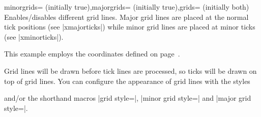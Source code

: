 \begin{pgfplotsxykeylist}{\x minorgrids= (initially true),\x majorgrids= (initially true),grids= (initially both)}
Enables/disables different grid lines. Major grid lines are placed at the normal tick positions (see |xmajorticks|) while minor grid lines are placed at minor ticks (see |xminorticks|). 

This example employs the coordinates defined on page~\pageref{page:plotcoords:src}.
\begin{codeexample}[]
\begin{tikzpicture}
\begin{loglogaxis}[
	xlabel={\textsc{Dof}},
	ylabel={$L_2$ Error},
	grid=major
]
\plotcoords
\end{loglogaxis}
\end{tikzpicture}
\end{codeexample}

\begin{codeexample}[]
\end{codeexample}

Grid lines will be drawn before tick lines are processed, so ticks will be drawn on top of grid lines. You can configure the appearance of grid lines with the styles
\begin{codeexample}
\end{codeexample}
\noindent and/or the shorthand macros |grid style=|, |minor grid style=| and |major grid style=|.
\end{pgfplotsxykeylist}


